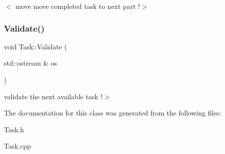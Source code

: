 $<$ move move completed task to next part !$>$ \mbox{\label{class_task_ad94a831f3fd8c66b41a1dd24f751cbb1}} 
\subsubsection{\texorpdfstring{Validate()}{Validate()}}
{\footnotesize\ttfamily void Task\+::\+Validate (\begin{DoxyParamCaption}\item[{std\+::ostream \&}]{os }\end{DoxyParamCaption})}

validate the next available task !$>$ 

The documentation for this class was generated from the following files\+:\begin{DoxyCompactItemize}
\item 
Task.\+h\item 
Task.\+cpp\end{DoxyCompactItemize}

